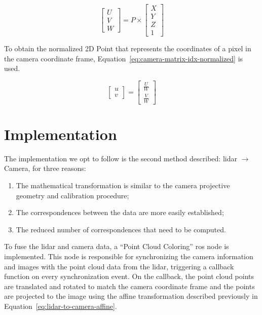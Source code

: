 \begin{equation}
	\label{eq:lidar-to-camera-affine}
		\begin{bmatrix}
			U \\
			V \\
			W
		\end{bmatrix}
		= P \times
		\begin{bmatrix}
			X \\
			Y \\
			Z \\
			1
		\end{bmatrix}
\end{equation}

To obtain the normalized 2D Point that represents the coordinates of a pixel in the camera coordinate frame, Equation~\eqref{eq:camera-matrix-idx-normalized} is used.

\begin{equation}
	\renewcommand\arraystretch{1.5}
	\label{eq:camera-matrix-idx-normalized}
	\begin{bmatrix}
		u \\
		v
	\end{bmatrix}
	= 
	\begin{bmatrix}
		\frac{U}{W} \\
		\frac{V}{W}
	\end{bmatrix}
\end{equation}


\section{Implementation}
\label{sec:sensor-fusion:implementation}
The implementation we opt to follow is the second method described: \ac{lidar}  $\rightarrow$ Camera, for three reasons:

\begin{enumerate}
	\item The mathematical transformation is similar to the camera projective geometry and calibration procedure;
	\item The correspondences between the data are more easily established;
	\item The reduced number of correspondences that need to be computed.
\end{enumerate}


To fuse the \ac{lidar} and camera data, a ``Point Cloud Coloring'' \ac{ros} node is implemented. This node is responsible for synchronizing the camera information and images with the point cloud data from the \ac{lidar}, triggering a callback function on every synchronization event. On the callback, the point cloud points are translated and rotated to match the camera coordinate frame and the points are projected to the image using the affine transformation described previously in Equation~\eqref{eq:lidar-to-camera-affine}.

